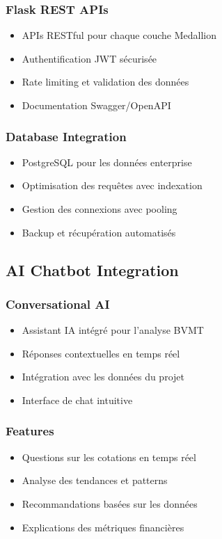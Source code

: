 \subsubsection{Flask REST APIs}
\begin{itemize}
    \item APIs RESTful pour chaque couche Medallion
    \item Authentification JWT sécurisée
    \item Rate limiting et validation des données
    \item Documentation Swagger/OpenAPI
\end{itemize}

\subsubsection{Database Integration}
\begin{itemize}
    \item PostgreSQL pour les données enterprise
    \item Optimisation des requêtes avec indexation
    \item Gestion des connexions avec pooling
    \item Backup et récupération automatisés
\end{itemize}

\subsection{AI Chatbot Integration}
\subsubsection{Conversational AI}
\begin{itemize}
    \item Assistant IA intégré pour l'analyse BVMT
    \item Réponses contextuelles en temps réel
    \item Intégration avec les données du projet
    \item Interface de chat intuitive
\end{itemize}

\subsubsection{Features}
\begin{itemize}
    \item Questions sur les cotations en temps réel
    \item Analyse des tendances et patterns
    \item Recommandations basées sur les données
    \item Explications des métriques financières
\end{itemize}

